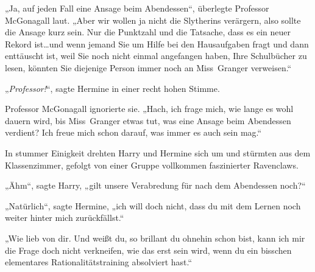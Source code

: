„Ja, auf jeden Fall eine Ansage beim Abendessen“, überlegte Professor McGonagall laut. „Aber wir wollen ja nicht die Slytherins verärgern, also sollte die Ansage kurz sein. Nur die Punktzahl und die Tatsache, dass es ein neuer Rekord ist…und wenn jemand Sie um Hilfe bei den Hausaufgaben fragt und dann enttäuscht ist, weil Sie noch nicht einmal angefangen haben, Ihre Schulbücher zu lesen, könnten Sie diejenige Person immer noch an Miss~Granger verweisen.“

„\emph{Professor!}“, sagte Hermine in einer recht hohen Stimme.

Professor McGonagall ignorierte sie. „Hach, ich frage mich, wie lange es wohl dauern wird, bis Miss~Granger etwas tut, was eine Ansage beim Abendessen verdient? Ich freue mich schon darauf, was immer es auch sein mag.“

In stummer Einigkeit drehten Harry und Hermine sich um und stürmten aus dem Klassenzimmer, gefolgt von einer Gruppe vollkommen faszinierter Ravenclaws.

„Ähm“, sagte Harry, „gilt unsere Verabredung für nach dem Abendessen noch?“

„Natürlich“, sagte Hermine, „ich will doch nicht, dass du mit dem Lernen noch weiter hinter mich zurückfällst.“

„Wie lieb von dir. Und weißt du, so brillant du ohnehin schon bist, kann ich mir die Frage doch nicht verkneifen, wie das erst sein wird, wenn du ein bisschen elementares Rationalitätstraining absolviert hast.“

